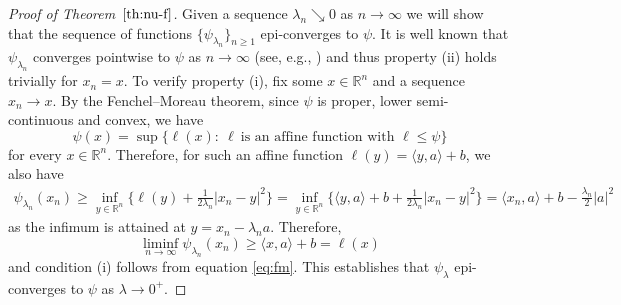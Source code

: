 \documentclass[11pt,leqno]{article}
\theoremstyle{definition}
\theoremstyle{remark}
\numberwithin{equation}{section}
\newcommand{\ls}{\leqslant}
\newcommand{\gr}{\geqslant}
\newcommand{\1}{\textbf{1}}
\newcommand{\R}{\mathbb{R}}
\begin{document}
\begin{proof}[Proof of Theorem~$\ref{th:nu-f}$]
Given a sequence $\lambda_n \searrow 0$ as $n\to\infty$ we will show that the sequence of functions $\{\psi_{\lambda_n}\}_{n\gr1}$ epi-converges to $\psi$. It is well known that $\psi_{\lambda_n}$ converges pointwise to $\psi$ as $n\to\infty$ (see, e.g., \cite[Theorem~1.25]{RW98}) and thus property (ii) holds trivially for $x_n=x$. To verify property (i), fix some $x\in\R^n$ and a sequence $x_n\to x$. By the Fenchel--Moreau theorem, since $\psi$ is proper, lower semi-continuous and convex, we have 
\begin{equation} \label{eq:fm}
\psi(x) = \sup \big\{ \ell(x): \ \ell \ \mbox{is an affine function with } \ell \ls \psi\big\}
\end{equation}
for every $x\in\R^n$. Therefore, for such an affine function $\ell(y) = \langle y,a\rangle + b$, we also have
\begin{equation*}
\begin{split}
\psi_{\lambda_n}(x_n) \gr \inf_{y\in\R^n} \Big\{ \ell(y) + \frac{1}{2\lambda_n} |x_n-y|^2 \Big\} = \inf_{y\in\R^n} \Big\{ \langle y,a\rangle+b + \frac{1}{2\lambda_n} |x_n-y|^2 \Big\}
= \langle x_n,a\rangle + b - \frac{\lambda_n}{2} |a|^2
\end{split}
\end{equation*}
as the infimum is attained at $y=x_n - \lambda_n a$. Therefore,
$$\liminf_{n\to\infty} \psi_{\lambda_n}(x_n) \gr \langle x,a\rangle+b = \ell(x)$$
and condition (i) follows from equation \eqref{eq:fm}. This establishes that $\psi_\lambda$ epi-converges to $\psi$ as $\lambda\to0^+$.


\end{proof}
\end{document}
